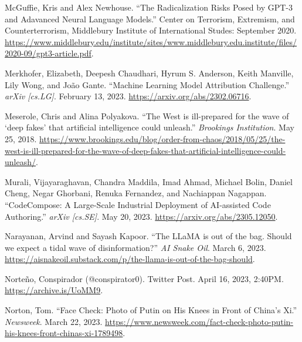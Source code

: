 \documentclass{article}
\begin{document}
\begin{thebibliography}{9}
  McGuffie, Kris and Alex Newhouse. ``The Radicalization Risks Posed by GPT-3 and Adavanced Neural Language Models.'' Center on Terrorism, Extremism, and Counterterrorism, Middlebury Institute of International Studes: September 2020. \href{https://www.middlebury.edu/institute/sites/www.middlebury.edu.institute/files/2020-09/gpt3-article.pdf}{https://www.middlebury.edu/institute/sites/www.middlebury.edu.institute/files/2020-09/gpt3-article.pdf}.

  Merkhofer, Elizabeth, Deepesh Chaudhari, Hyrum S. Anderson, Keith Manville, Lily Wong, and João Gante. ``Machine Learning Model Attribution Challenge.'' \textit{arXiv [cs.LG]}. February 13, 2023. \href{https://arxiv.org/abs/2302.06716}{https://arxiv.org/abs/2302.06716}. 

  Meserole, Chris and Alina Polyakova. ``The West is ill-prepared for the wave of `deep fakes' that artificial intelligence could unleash.'' \textit{Brookings Institution}. May 25, 2018. \href{https://www.brookings.edu/blog/order-from-chaos/2018/05/25/the-west-is-ill-prepared-for-the-wave-of-deep-fakes-that-artificial-intelligence-could-unleash/}{https://www.brookings.edu/blog/order-from-chaos/2018/05/25/the-west-is-ill-prepared-for-the-wave-of-deep-fakes-that-artificial-intelligence-could-unleash/}. 

  Murali, Vijayaraghavan, Chandra Maddila, Imad Ahmad, Michael Bolin, Daniel Cheng, Negar Ghorbani, Renuka Fernandez, and Nachiappan Nagappan. ``CodeCompose: A Large-Scale Industrial Deployment of AI-assisted Code Authoring.'' \textit{arXiv [cs.SE]}. May 20, 2023. \href{https://arxiv.org/abs/2305.12050}{https://arxiv.org/abs/2305.12050}. 

  Narayanan, Arvind and Sayash Kapoor. ``The LLaMA is out of the bag. Should we expect a tidal wave of disinformation?'' \textit{AI Snake Oil}. March 6, 2023. \href{https://aisnakeoil.substack.com/p/the-llama-is-out-of-the-bag-should}{https://aisnakeoil.substack.com/p/the-llama-is-out-of-the-bag-should}.

  Norteño, Conspirador (@conspirator0). Twitter Post. April 16, 2023, 2:40PM. \href{https://archive.is/UoMM9}{https://archive.is/UoMM9}. 

  Norton, Tom. ``Face Check: Photo of Putin on His Knees in Front of China's Xi.'' \textit{Newsweek}. March 22, 2023. \href{https://www.newsweek.com/fact-check-photo-putin-his-knees-front-chinas-xi-1789498}{https://www.newsweek.com/fact-check-photo-putin-his-knees-front-chinas-xi-1789498}. 


\end{thebibliography}
\end{document}
